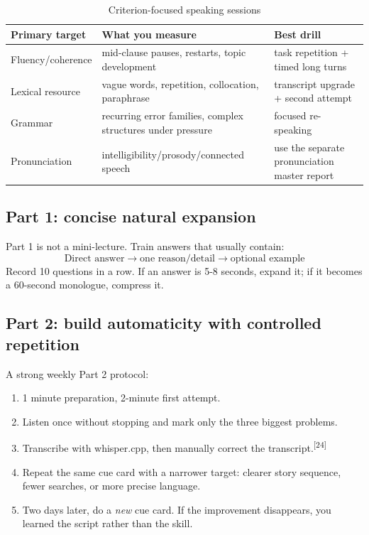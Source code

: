 \documentclass[11pt,a4paper]{article}
\newcommand{\src}[1]{\textsuperscript{[#1]}}
\begin{document}
\begin{table}[H]
\centering
\caption{Criterion-focused speaking sessions}
\begin{tabularx}{\textwidth}{p{3.1cm}X X}
\toprule
Primary target & What you measure & Best drill \\
\midrule
Fluency/coherence & mid-clause pauses, restarts, topic development & task repetition + timed long turns \\
Lexical resource & vague words, repetition, collocation, paraphrase & transcript upgrade + second attempt \\
Grammar & recurring error families, complex structures under pressure & focused re-speaking \\
Pronunciation & intelligibility/prosody/connected speech & use the separate pronunciation master report \\
\bottomrule
\end{tabularx}
\end{table}

\subsection{Part 1: concise natural expansion}
Part 1 is not a mini-lecture. Train answers that usually contain:
\[
\text{Direct answer} \rightarrow \text{one reason/detail} \rightarrow \text{optional example}
\]
Record 10 questions in a row. If an answer is 5-8 seconds, expand it; if it becomes a 60-second monologue, compress it.

\subsection{Part 2: build automaticity with controlled repetition}
A strong weekly Part 2 protocol:
\begin{enumerate}
\item 1 minute preparation, 2-minute first attempt.
\item Listen once without stopping and mark only the three biggest problems.
\item Transcribe with whisper.cpp, then manually correct the transcript.\src{24}
\item Repeat the same cue card with a narrower target: clearer story sequence, fewer searches, or more precise language.
\item Two days later, do a \emph{new} cue card. If the improvement disappears, you learned the script rather than the skill.
\end{enumerate}
\end{document}
